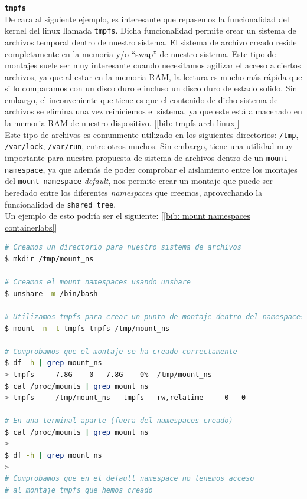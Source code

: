 \documentclass[12pt]{article}
\begin{document}
	\pagebreak
	
	\noindent \textbf{\large \texttt{tmpfs}}\\
	
	\noindent De cara al siguiente ejemplo, es interesante que repasemos la funcionalidad del kernel del linux llamada \texttt{tmpfs}. Dicha funcionalidad permite crear un sistema de archivos temporal dentro de nuestro sistema. El sistema de archivo creado reside completamente en la memoria y/o ``swap'' de nuestro sistema. Este tipo de montajes suele ser muy interesante cuando necesitamos agilizar el acceso a ciertos archivos, ya que al estar en la memoria RAM, la lectura es mucho más rápida que si lo comparamos con un disco duro e incluso un disco duro de estado solido. Sin embargo, el inconveniente que tiene es que el contenido de dicho sistema de archivos se elimina una vez reiniciemos el sistema, ya que este está almacenado en la memoria RAM de nuestro dispositivo. [\ref{bib: tmpfs arch linux}] \\
	
	\noindent Este tipo de archivos es comunmente utilizado en los siguientes directorios: \texttt{/tmp}, \texttt{/var/lock}, \texttt{/var/run}, entre otros muchos. Sin embargo, tiene una utilidad muy importante para nuestra propuesta de sistema de archivos dentro de un \texttt{mount namespace}, ya que además de poder comprobar el aislamiento entre los montajes del \texttt{mount namespace} \textit{default}, nos permite crear un montaje que puede ser heredado entre los diferentes \textit{namespaces} que creemos, aprovechando la funcionalidad de \texttt{shared tree}. \\
	
	\noindent Un ejemplo de esto podría ser el siguiente: [\ref{bib: mount namespaces containerlabs}]
	\begin{lstlisting}[language=bash, caption={Uso de \texttt{mount namespaces} con ``tmpfs''}]
# Creamos un directorio para nuestro sistema de archivos
$ mkdir /tmp/mount_ns

# Creamos el mount namespaces usando unshare
$ unshare -m /bin/bash

# Utilizamos tmpfs para crear un punto de montaje dentro del namespaces
$ mount -n -t tmpfs tmpfs /tmp/mount_ns

# Comprobamos que el montaje se ha creado correctamente
$ df -h | grep mount_ns
> tmpfs		7.8G	0	7.8G	0%	/tmp/mount_ns
$ cat /proc/mounts | grep mount_ns
> tmpfs		/tmp/mount_ns	tmpfs	rw,relatime		0	0

# En una terminal aparte (fuera del namespaces creado)
$ cat /proc/mounts | grep mount_ns
>
$ df -h | grep mount_ns
>
# Comprobamos que en el default namespace no tenemos acceso 
# al montaje tmpfs que hemos creado
	\end{lstlisting}
	
\end{document}
